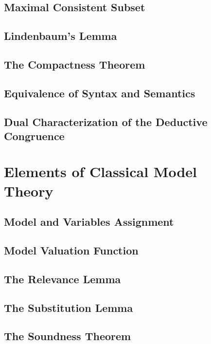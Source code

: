 \documentclass{report}
\begin{document}
    \subsection{Maximal Consistent Subset}
      
    \subsection{Lindenbaum's Lemma}
      
    \subsection{The Compactness Theorem}
      
    \subsection{Equivalence of Syntax and Semantics}
      
    \subsection{Dual Characterization of the Deductive Congruence}
      
\section{Elements of Classical Model Theory}
    \subsection{Model and Variables Assignment}
      
    \subsection{Model Valuation Function}
      
    \subsection{The Relevance Lemma}
      
    \subsection{The Substitution Lemma}
      
    \subsection{The Soundness Theorem}
      
\end{document}
